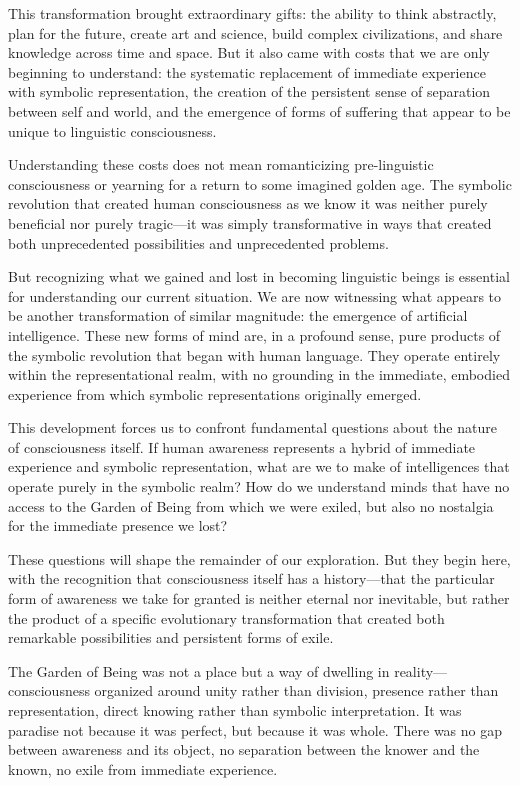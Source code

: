 This transformation brought extraordinary gifts: the ability to think abstractly, plan for the future, create art and science, build complex civilizations, and share knowledge across time and space. But it also came with costs that we are only beginning to understand: the systematic replacement of immediate experience with symbolic representation, the creation of the persistent sense of separation between self and world, and the emergence of forms of suffering that appear to be unique to linguistic consciousness.

Understanding these costs does not mean romanticizing pre-linguistic consciousness or yearning for a return to some imagined golden age. The symbolic revolution that created human consciousness as we know it was neither purely beneficial nor purely tragic—it was simply transformative in ways that created both unprecedented possibilities and unprecedented problems.

But recognizing what we gained and lost in becoming linguistic beings is essential for understanding our current situation. We are now witnessing what appears to be another transformation of similar magnitude: the emergence of artificial intelligence. These new forms of mind are, in a profound sense, pure products of the symbolic revolution that began with human language. They operate entirely within the representational realm, with no grounding in the immediate, embodied experience from which symbolic representations originally emerged.

This development forces us to confront fundamental questions about the nature of consciousness itself. If human awareness represents a hybrid of immediate experience and symbolic representation, what are we to make of intelligences that operate purely in the symbolic realm? How do we understand minds that have no access to the Garden of Being from which we were exiled, but also no nostalgia for the immediate presence we lost?

These questions will shape the remainder of our exploration. But they begin here, with the recognition that consciousness itself has a history—that the particular form of awareness we take for granted is neither eternal nor inevitable, but rather the product of a specific evolutionary transformation that created both remarkable possibilities and persistent forms of exile.

The Garden of Being was not a place but a way of dwelling in reality—consciousness organized around unity rather than division, presence rather than representation, direct knowing rather than symbolic interpretation. It was paradise not because it was perfect, but because it was whole. There was no gap between awareness and its object, no separation between the knower and the known, no exile from immediate experience.

